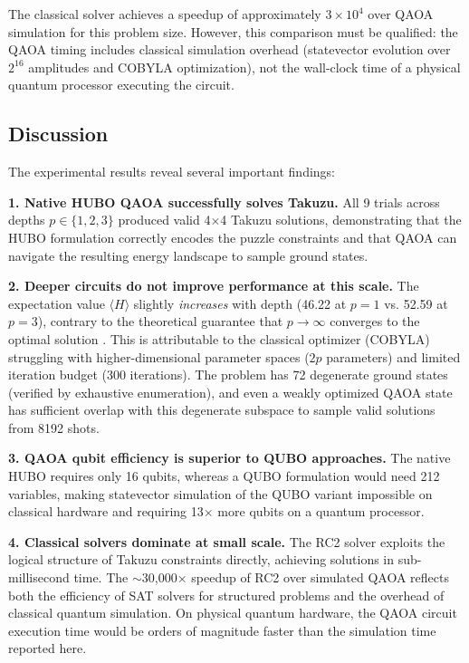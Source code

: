 \documentclass[eng]{ajceam-class}
\begin{document}
The classical solver achieves a speedup of approximately $3 \times 10^4$ over QAOA simulation for this problem size. However, this comparison must be qualified: the QAOA timing includes classical simulation overhead (statevector evolution over $2^{16}$ amplitudes and COBYLA optimization), not the wall-clock time of a physical quantum processor executing the circuit.

\subsection{Discussion}

The experimental results reveal several important findings:

\textbf{1. Native HUBO QAOA successfully solves Takuzu.} All 9 trials across depths $p \in \{1, 2, 3\}$ produced valid 4$\times$4 Takuzu solutions, demonstrating that the HUBO formulation correctly encodes the puzzle constraints and that QAOA can navigate the resulting energy landscape to sample ground states.

\textbf{2. Deeper circuits do not improve performance at this scale.} The expectation value $\langle H \rangle$ slightly \emph{increases} with depth (46.22 at $p=1$ vs. 52.59 at $p=3$), contrary to the theoretical guarantee that $p \rightarrow \infty$ converges to the optimal solution \cite{farhi2014qaoa}. This is attributable to the classical optimizer (COBYLA) struggling with higher-dimensional parameter spaces ($2p$ parameters) and limited iteration budget (300 iterations). The problem has 72 degenerate ground states (verified by exhaustive enumeration), and even a weakly optimized QAOA state has sufficient overlap with this degenerate subspace to sample valid solutions from 8192 shots.

\textbf{3. QAOA qubit efficiency is superior to QUBO approaches.} The native HUBO requires only 16 qubits, whereas a QUBO formulation would need 212 variables, making statevector simulation of the QUBO variant impossible on classical hardware and requiring 13$\times$ more qubits on a quantum processor.

\textbf{4. Classical solvers dominate at small scale.} The RC2 solver exploits the logical structure of Takuzu constraints directly, achieving solutions in sub-millisecond time. The $\sim$30,000$\times$ speedup of RC2 over simulated QAOA reflects both the efficiency of SAT solvers for structured problems and the overhead of classical quantum simulation. On physical quantum hardware, the QAOA circuit execution time would be orders of magnitude faster than the simulation time reported here.
\end{document}
